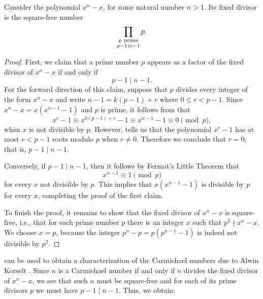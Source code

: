 \begin{theorem}\label{theorem:fixed-divisors-fermat-polynomials}
  Consider the polynomial $x^n-x$, for some natural number $n> 1$. Its fixed divisor is the square-free number
  \begin{equation*}
    \prod_{\substack{p\ \textup{prime} \\ p-1 \mid n-1}} p.
  \end{equation*}
\end{theorem}

\begin{proof}
  First, we claim that a prime number $p$ appears as a factor of the fixed divisor of $x^n-x$ if and only if
  \begin{equation*}
    p-1\mid n-1.
  \end{equation*}
  For the forward direction of this claim, suppose that $p$ divides every integer of the form $x^n-x$ and write $n-1=k(p-1)+r$ where $0\leq r<p-1$. Since $x^n-x=x(x^{n-1}-1)$ and $p$ is prime, it follows from  that
  \begin{equation*}
    x^r-1\equiv x^{k(p-1)+r}-1\equiv x^{n-1}-1\equiv 0\pmod{p},
  \end{equation*}
  when $x$ is not divisible by $p$. However,  tells us that the polynomial $x^r-1$ has at most $r<p-1$ roots modulo $p$ when $r\neq 0$. Therefore we conclude that $r=0$; that is, $p-1\mid n-1$.

  Conversely, if $p-1\mid n-1$, then it follows by Fermat's Little Theorem that
  \begin{equation*}
    x^{n-1}\equiv 1\pmod{p}
  \end{equation*}
  for every $x$ not divisible by $p$. This implies that $x(x^{n-1}-1)$ is divisible by $p$ for every $x$, completing the proof of the first claim.

  To finish the proof, it remains to show that the fixed divisor of $x^n-x$ is square-free, i.e., that for each prime number $p$ there is an integer $x$ such that $p^2\nmid x^n-x$. We choose $x=p$, because the integer $p^n-p=p(p^{n-1}-1)$ is indeed not divisible by $p^2$.
\end{proof}

 can be used to obtain a characterization of the Carmichael numbers due to Alwin Korselt \cite{korselt1899}. Since $n$ is a Carmichael number if and only if $n$ divides the fixed divisor of $x^n-x$, we see that such $n$ must be square-free and for each of its prime divisors $p$ we must have $p-1\mid n-1$. Thus, we obtain:


